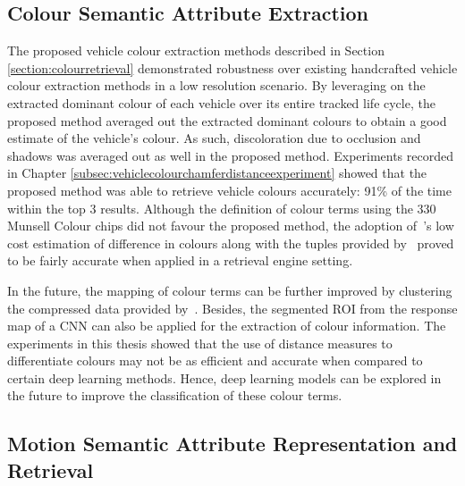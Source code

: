 \subsection*{Colour Semantic Attribute Extraction}
The proposed vehicle colour extraction methods described in Section \ref{section:colourretrieval}  demonstrated robustness over existing handcrafted vehicle colour extraction methods in a low resolution scenario.
By leveraging on the extracted dominant colour of each vehicle over its entire tracked life cycle, the proposed method averaged out the extracted dominant colours to obtain a good estimate of the vehicle's colour.
As such, discoloration due to occlusion and shadows was averaged out as well in the proposed method. Experiments recorded in Chapter \ref{subsec:vehiclecolourchamferdistanceexperiment} showed that the proposed method was able to retrieve vehicle colours accurately: 91\% of the time within the top 3 results.   %
Although the definition of colour terms using the 330 Munsell Colour chips did not favour the proposed method, the adoption of~'s low cost estimation of difference in colours %
along with the tuples provided by~ proved to be fairly accurate when applied in a retrieval engine setting.     

In the future, the mapping of colour terms can be further improved by clustering the compressed data provided by~. Besides, the segmented ROI from the response map of a CNN can also be applied for the extraction of colour information. The experiments in this thesis showed that the use of distance measures to differentiate colours may not be as efficient and accurate when compared to certain deep learning methods. Hence, deep learning models can be explored in the future to improve the classification of these colour terms.

\vspace{1em}
\subsection*{Motion Semantic Attribute Representation and Retrieval}

